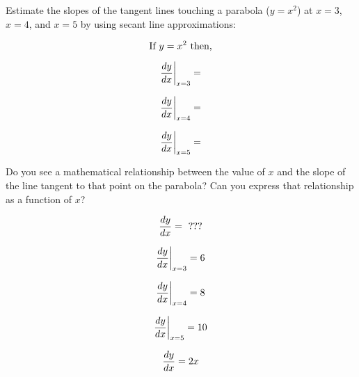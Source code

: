 

Estimate the slopes of the tangent lines touching a parabola ($y = x^2$) at $x=3$, $x=4$, and $x=5$ by using secant line approximations:

\vskip 10pt

$$\hbox{If } y = x^2 \hbox{ then,}$$

\vskip 20pt

$${{dy \over dx} \bigg|} _ {x=3} = $$

\vskip 20pt

$${{dy \over dx} \bigg|} _ {x=4} = $$

\vskip 20pt

$${{dy \over dx} \bigg|} _ {x=5} = $$

\vskip 20pt

Do you see a mathematical relationship between the value of $x$ and the slope of the line tangent to that point on the parabola?  Can you express that relationship as a function of $x$?

$${dy \over dx} = \hbox{ ???}$$







$${{dy \over dx} \bigg|} _ {x=3} = 6$$

\vskip 20pt

$${{dy \over dx} \bigg|} _ {x=4} = 8$$

\vskip 20pt

$${{dy \over dx} \bigg|} _ {x=5} = 10$$

\vskip 20pt

$${dy \over dx} = 2x$$












